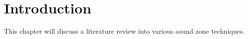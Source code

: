 \section{Introduction}
This chapter will discuss a literature review into various sound zone techniques.

